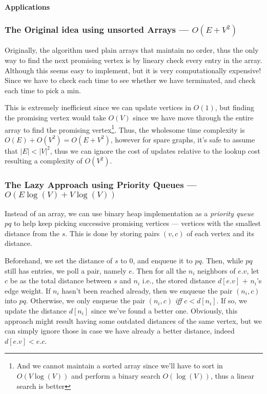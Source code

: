 \documentclass[12pt]{article}
\begin{document}
\paragraph{Applications}

\subsubsection{The Original idea using unsorted Arrays --- $O(E + V^2)$}

Originally, the algorithm used plain arrays that maintain no order, thus the only way to find the next promising vertex is by lineary check every entry in the array. Although this seems easy to implement, but it is very computationally expensive! Since we have to check each time to see whether we have terminated, and check each time to pick a min.



This is extremely inefficient since we can update vertices in $O(1)$, but finding the promising vertex would take $O(V)$ since we have move through the entire array to find the promising vertex\footnote{And we cannot maintain a sorted array since we'll have to sort in $O(V\log(V))$ and perform a binary search $O(\log(V))$, thus a linear search is better}. Thus, the wholesome time complexity is $O(E) + O(V^2) = O(E + V^2)$, however for spare graphs, it's safe to assume that $|E| < |V|^2$, thus we can ignore the cost of updates relative to the lookup cost resulting a complexity of $O(V^2)$.

\subsubsection{The Lazy Approach using Priority Queues --- $O(E\log(V) + V\log(V))$}

Instead of an array, we can use binary heap implementation as a \textit{priority queue} $pq$ to help keep picking successive promising vertices ---  vertices with the smallest distance from the $s$. This is done by storing pairs $(v,c)$ of each vertex and its distance.

Beforehand, we set the distance of $s$ to $0$, and enqueue it to $pq$. Then, while $pq$ still has entries, we poll a pair, namely $e$. Then for all the $n_i$ neighbors of $e.v$, let $c$ be as the total distance between $s$ and $n_i$ i.e., the stored distance $d[e.v]$ + $n_i$'s edge weight. If $n_i$ hasn't been reached already, then we enqueue the pair $(n_i,c)$ into $pq$. Otherwise, we only enqueue the pair $(n_i,c)$ \textit{iff} $c < d[n_i]$. If so, we update the distance $d[n_i]$ since we've found a better one. Obviously, this approach might result having some outdated distances of the same vertex, but we can simply ignore those in case we have already a better distance, indeed $d[e.v] < e.c$.
\end{document}
